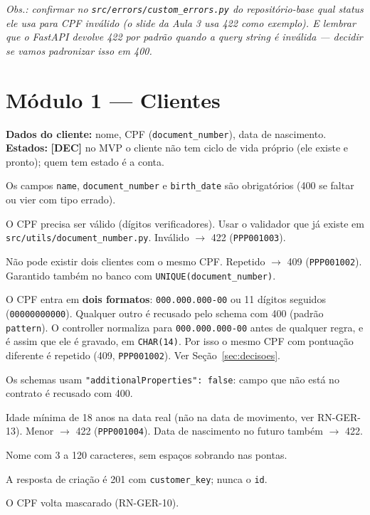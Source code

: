 \documentclass[11pt,a4paper]{article}
\newcommand{\obr}{\textbf{[OBR]}}          %
\newcommand{\dec}{\textbf{[DEC]}}          %
\newcommand{\tb}[1]{\texttt{#1}}           %
\begin{document}
\medskip
\textit{Obs.: confirmar no \tb{src/errors/custom_errors.py} do repositório-base qual status ele usa
para CPF inválido (o slide da Aula 3 usa 422 como exemplo). E lembrar que o FastAPI devolve 422
por padrão quando a query string é inválida --- decidir se vamos padronizar isso em 400.}

\section{Módulo 1 --- Clientes}

\textbf{Dados do cliente:} nome, CPF (\tb{document_number}), data de nascimento.
\textbf{Estados:} \dec{} no MVP o cliente não tem ciclo de vida próprio (ele existe e pronto); quem
tem estado é a conta.

\begin{regras}
  \item[RN-CLI-01 \obr] Os campos \tb{name}, \tb{document_number} e \tb{birth_date} são
  obrigatórios (400 se faltar ou vier com tipo errado).
  \item[RN-CLI-02 \obr] O CPF precisa ser válido (dígitos verificadores). Usar o validador que já
  existe em \tb{src/utils/document_number.py}. Inválido $\to$ 422 (\tb{PPP001003}).
  \item[RN-CLI-03 \obr] Não pode existir dois clientes com o mesmo CPF. Repetido $\to$ 409
  (\tb{PPP001002}). Garantido também no banco com \tb{UNIQUE(document_number)}.
  \item[RN-CLI-04 \dec] O CPF entra em \textbf{dois formatos}: \tb{000.000.000-00} ou 11 dígitos
  seguidos (\tb{00000000000}). Qualquer outro é recusado pelo schema com 400 (padrão
  \tb{pattern}). O controller normaliza para \tb{000.000.000-00} antes de qualquer regra, e é
  assim que ele é gravado, em \tb{CHAR(14)}. Por isso o mesmo CPF com pontuação diferente é
  repetido (409, \tb{PPP001002}). Ver Seção~\ref{sec:decisoes}.
  \item[RN-CLI-04b \dec] Os schemas usam \tb{"additionalProperties": false}: campo que não está no
  contrato é recusado com 400.
  \item[RN-CLI-05 \dec] Idade mínima de 18 anos na data real (não na data de movimento, ver
  RN-GER-13). Menor $\to$ 422 (\tb{PPP001004}). Data de nascimento no futuro também $\to$ 422.
  \item[RN-CLI-06 \dec] Nome com 3 a 120 caracteres, sem espaços sobrando nas pontas.
  \item[RN-CLI-07 \obr] A resposta de criação é 201 com \tb{customer_key}; nunca o \tb{id}.
  \item[RN-CLI-08 \dec] O CPF volta mascarado (RN-GER-10).
\end{regras}
\end{document}
